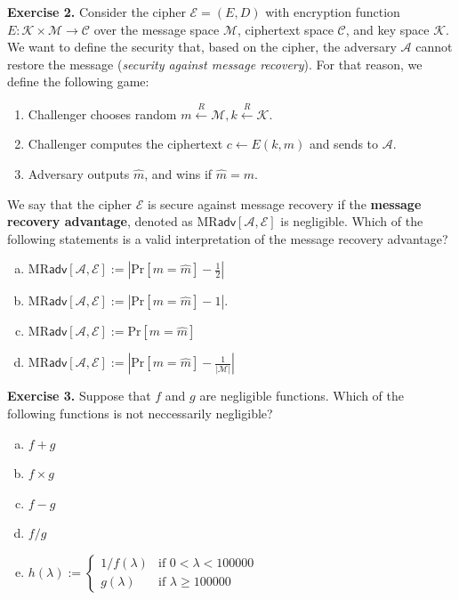 \documentclass[../lecture-notes.tex]{subfiles}
\begin{document}
\textbf{Exercise 2.} Consider the cipher $\mathcal{E} = (E,D)$ with encryption function $E: \mathcal{K} \times \mathcal{M} \to \mathcal{C}$ over the message space $\mathcal{M}$, ciphertext space $\mathcal{C}$, and key space $\mathcal{K}$. We want to define the security
that, based on the cipher, the adversary $\mathcal{A}$ cannot restore the message (\textit{security against message recovery}). For that reason, we define the following game:
\begin{enumerate}
    \item Challenger chooses random $m \xleftarrow{R} \mathcal{M}, k \xleftarrow{R} \mathcal{K}$.
    \item Challenger computes the ciphertext $c \gets E(k,m)$ and sends to $\mathcal{A}$.
    \item Adversary outputs $\hat{m}$, and wins if $\hat{m} = m$.
\end{enumerate}

We say that the cipher $\mathcal{E}$ is secure against message recovery if the \textbf{message recovery advantage}, denoted as $\text{MR}\textsf{adv}[\mathcal{A}, \mathcal{E}]$ is negligible. Which of the following statements is a valid interpretation of the message recovery advantage?
\begin{enumerate}[a)]
    \item $\text{MR}\textsf{adv}[\mathcal{A},\mathcal{E}] := \left|\text{Pr}[m=\hat{m}] - \frac{1}{2}\right|$
    \item $\text{MR}\textsf{adv}[\mathcal{A},\mathcal{E}] := \left|\text{Pr}[m=\hat{m}] - 1\right|$.
    \item $\text{MR}\textsf{adv}[\mathcal{A},\mathcal{E}] := \text{Pr}[m=\hat{m}]$
    \item $\text{MR}\textsf{adv}[\mathcal{A},\mathcal{E}] := \left|\text{Pr}[m=\hat{m}] - \frac{1}{|\mathcal{M}|}\right|$
\end{enumerate}

\textbf{Exercise 3.} Suppose that $f$ and $g$ are negligible functions. Which of the following functions is not neccessarily negligible?
\begin{enumerate}[a)]
    \item $f + g$
    \item $f \times g$
    \item $f - g$
    \item $f/g$
    \item $h(\lambda) := \begin{cases}
        1/f(\lambda) & \text{if } 0 < \lambda < 100000 \\
        g(\lambda) & \text{if } \lambda \geq 100000
    \end{cases}$
\end{enumerate}
\end{document}
